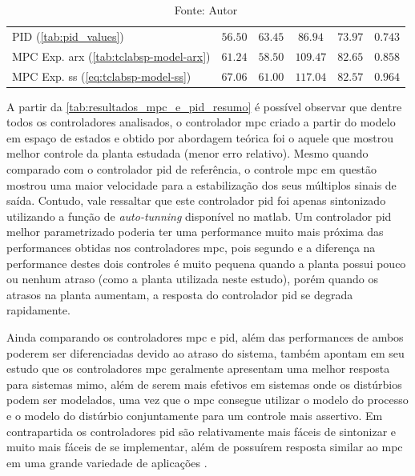 \begin{table}[!h]
\begin{tabular}{l|cccc|c}
		PID (\cref{tab:pid_values})	                                        &   $56.50$           												&   $63.45$          											&   $86.94$          														&   $73.97$														&   $0.743$             														\\ 
		MPC Exp. \acrshort{arx}	(\cref{tab:tclabsp-model-arx})				&   $61.24$           												&   $58.50$          											&   $109.47$         														&   $82.65$														&   $0.858$             														\\ 
		MPC Exp. \acrshort{ss} (\cref{eq:tclabsp-model-ss})					&   $67.06$           												&   $61.00$          											&   $117.04$         														&   $82.57$														&   $0.964$             														\\ \bottomrule 
	\end{tabular}
	\caption*{Fonte: Autor}
\end{table}

\clearpage

A partir da \cref{tab:resultados_mpc_e_pid_resumo} é possível observar que dentre todos os controladores analisados,
o controlador \acrshort{mpc} criado a partir do modelo em espaço de estados e obtido por abordagem teórica
foi o aquele que mostrou melhor controle da planta estudada (menor erro relativo). Mesmo quando comparado com o controlador 
\acrshort{pid} de referência, o controle \acrshort{mpc} em questão mostrou uma maior velocidade para a estabilização
dos seus múltiplos sinais de saída. Contudo, vale ressaltar que este controlador \acrshort{pid} 
foi apenas sintonizado utilizando a função de \textit{auto-tunning} disponível no \acrshort{matlab}.
Um controlador \acrshort{pid} melhor parametrizado poderia ter uma performance muito mais próxima das 
performances obtidas nos controladores \acrshort{mpc}, pois segundo  e
 a diferença na performance destes dois controles é muito pequena quando
a planta possui pouco ou nenhum atraso (como a planta utilizada neste estudo), porém quando os atrasos
na planta aumentam, a resposta do controlador \acrshort{pid} se degrada rapidamente.

Ainda comparando os controladores \acrshort{mpc} e \acrshort{pid}, além das performances de ambos poderem ser
diferenciadas devido ao atraso do sistema,  também apontam em seu estudo que os
controladores \acrshort{mpc} geralmente apresentam uma melhor resposta para sistemas \acrshort{mimo},
além de serem mais efetivos em sistemas onde os distúrbios podem ser modelados, uma vez que o
\acrshort{mpc} consegue utilizar o modelo do processo e o modelo do distúrbio conjuntamente para um 
controle mais assertivo. Em contrapartida os controladores \acrshort{pid} são relativamente mais
fáceis de sintonizar e muito mais fáceis de se implementar, além de possuírem resposta similar ao \acrshort{mpc}
em uma grande variedade de aplicações \cite{Taysom2017}.

